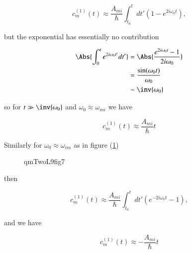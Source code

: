 \begin{equation}\label{eqn:qmTwoL9:550}
c_m^{(1)}(t) \approx
\frac{A_{mi}}{\hbar} \int_{t_0}^t dt' 
\left( 
1
-e^{2 i \omega_0 t }
\right),
\end{equation}

but the exponential has essentially no contribution

\begin{align*}
\Abs{\int_0^t e^{2 i \omega_0 t'} dt' } 
&= 
\Abs{\frac{e^{2 i \omega_0 t} -1 }{2 i \omega_0}}  \\
&= 
\frac{\sin(\omega_0 t)}{\omega_0} \\
&\sim \inv{\omega_0}
\end{align*}

so for $t \gg \inv{\omega_0}$ and $\omega_0 \approx \omega_{mi}$ we have 

\begin{equation}\label{eqn:qmTwoL9:570}
c_m^{(1)}(t) \approx \frac{A_{mi}}{\hbar} t
\end{equation}

Similarly for $\omega_0 \approx \omega_{im}$ as in figure (\ref{fig:qmTwoL9fig7}) 

\begin{figure}[htp]
   \centering
   \def\svgwidth{0.3\columnwidth}
   
   \caption{qmTwoL9fig7}\label{fig:qmTwoL9fig7}
\end{figure}

then

\begin{equation}\label{eqn:qmTwoL9:590}
c_m^{(1)}(t) \approx
\frac{A_{mi}}{\hbar} \int_{t_0}^t dt' 
\left( 
e^{-2 i \omega_0 t }
-1
\right),
\end{equation}

and we have

\begin{equation}\label{eqn:qmTwoL9:610}
c_m^{(1)}(t) \approx -\frac{A_{mi}}{\hbar} t
\end{equation}

\EndArticle
